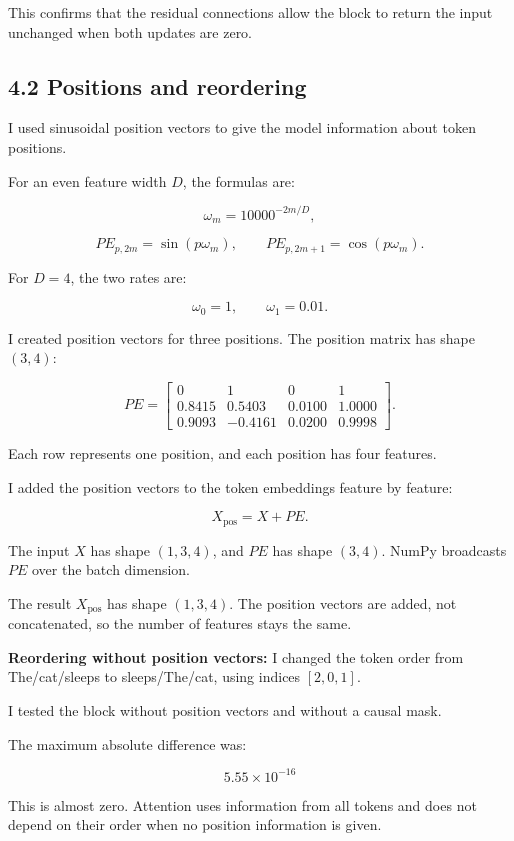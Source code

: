 \documentclass[11pt]{article}
\begin{document}
This confirms that the residual connections
allow the block to return the input unchanged
when both updates are zero.
\subsection*{4.2 Positions and reordering}
I used sinusoidal position vectors to give the
model information about token positions.

For an even feature width $D$, the formulas are:

\[
\omega_m = 10000^{-2m/D},
\]

\[
PE_{p,2m} = \sin(p\omega_m),
\qquad
PE_{p,2m+1} = \cos(p\omega_m).
\]

For $D=4$, the two rates are:

\[
\omega_0=1,\qquad \omega_1=0.01.
\]

I created position vectors for three positions.
The position matrix has shape $(3,4)$:

\[
PE=
\begin{bmatrix}
0 & 1 & 0 & 1\\
0.8415 & 0.5403 & 0.0100 & 1.0000\\
0.9093 & -0.4161 & 0.0200 & 0.9998
\end{bmatrix}.
\]

Each row represents one position, and each
position has four features.

I added the position vectors to the token
embeddings feature by feature:

\[
X_{\mathrm{pos}}=X+PE.
\]

The input $X$ has shape $(1,3,4)$, and $PE$
has shape $(3,4)$. NumPy broadcasts $PE$
over the batch dimension.

The result $X_{\mathrm{pos}}$ has shape $(1,3,4)$.
The position vectors are added, not concatenated,
so the number of features stays the same.


\textbf{Reordering without position vectors:} I changed the token order from The/cat/sleeps
to sleeps/The/cat, using indices $[2,0,1]$.

I tested the block without position vectors
and without a causal mask.

The maximum absolute difference was:

\[
\boxed{5.55\times10^{-16}}
\]

This is almost zero. Attention uses information
from all tokens and does not depend on their
order when no position information is given.
\end{document}
